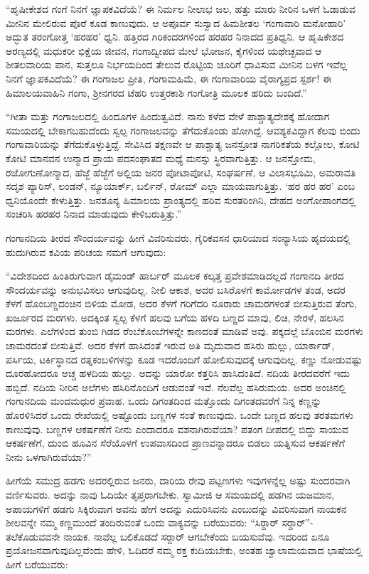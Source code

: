  “ಹೃಷೀಕೇಶದ ಗಂಗೆ ನಿನಗೆ ಜ್ಞಾಪಕವಿದೆಯೆ? ಈ ನಿರ್ಮಲ ನೀಲಾಭ ಜಲ, ಹತ್ತು ಮಾರು ನೀರಿನ ಒಳಗೆ ಓಡಾಡುವ ಮೀನಿನ ಮೇಲಿರುವ ಪೊರೆ ಕೂಡ ಕಾಣುವುದು. ಆ ಅಪೂರ್ವ ಸುಸ್ವಾದ ಹಿಮಶೀತಲ ‘ಗಂಗಾವಾರಿ ಮನೋಹಾರಿ’ ಅದ್ಭುತ ತರಂಗೋತ್ತ ‘ಹರಹರ’ ಧ್ವನಿ. ಹತ್ತಿರದ ಗಿರಿಕಂದರಗಳಿಂದ ಹರಹರ ನಿನಾದದ ಪ್ರತಿಧ್ವನಿ. ಆ ಹೃಷಿಕೇಶದ ಅರಣ್ಯದಲ್ಲಿ ಮಧುಕರೀ ಭಿಕ್ಷೆಯ ಜೀವನ, ಗಂಗಾದ್ವೀಪದ ಮೇಲೆ ಭೋಜನ, ಕೈಗಳಿಂದ ಯಥೇಚ್ಛವಾದ ಆ ಶೀತಲವಾರಿಯ ಪಾನ, ಸುತ್ತಲೂ ನಿರ್ಭಯದಿಂದ ತೇಲುವ ರೊಟ್ಟಿಯ ಚೂರಿಗೆ ಧಾವಿಸುವ ಮೀನಿನ ಬಳಗ ಇವೆಲ್ಲ ನಿನಗೆ ಜ್ಞಾಪಕವಿದೆಯೆ? ಈ ಗಂಗಾಜಲ ಪ್ರೀತಿ, ಗಂಗಾಮಹಿಮೆ, ಈ ಗಂಗಾವಾರಿಯ ವೈರಾಗ್ಯಪ್ರದ ಸ್ಪರ್ಶ! ಈ ಹಿಮಾಲಯವಾಹಿನಿ ಗಂಗಾ, ಶ‍್ರೀನಗರದ ಟೆಹರಿ ಉತ್ತರಕಾಶಿ ಗಂಗೋತ್ರಿ ಮೂಲಕ ಹರಿದು ಬಂದಿದೆ.” 

 “ಗೀತಾ ಮತ್ತು ಗಂಗಾಜಲದಲ್ಲಿ ಹಿಂದೂಗಳ ಹಿಂದುತ್ವವಿದೆ. ನಾನು ಕಳೆದ ವೇಳೆ ಪಾಶ್ಚಾತ್ಯದೇಶಕ್ಕೆ ಹೋದಾಗ ಸಮಯದಲ್ಲಿ ಬೇಕಾಗಬಹುದೆಂದು ಸ್ವಲ್ಪ ಗಂಗಾಜಲವನ್ನು ತೆಗೆದುಕೊಂಡು ಹೋಗಿದ್ದೆ. ಆವಶ್ಯಕವಿದ್ದಾಗ ಕೆಲವು ಬಿಂದು ಗಂಗಾವಾರಿಯನ್ನು ತೆಗೆದುಕೊಳ್ಳುತ್ತಿದ್ದೆ. ಸೇವಿಸಿದ ತಕ್ಷಣವೇ ಆ ಪಾಶ್ಚಾತ್ಯ ಜನಸ್ರೋತ ನಾಗರಿಕತೆಯ ಕಲ್ಲೋಲ, ಕೋಟಿ ಕೋಟಿ ಮಾನವನ ಉನ್ಮಾದ ಪ್ರಾಯ ಪದಸಂಘಾತದ ಮಧ್ಯೆ ಮನಸ್ಸು ಸ್ಥಿರವಾಗುತ್ತಿತ್ತು. ಆ ಜನಸ್ತೋಮ, ರಜೋಗುಣೋನ್ಮಾದ, ಹೆಜ್ಜೆ ಹೆಜ್ಜೆಗೆ ಅಲ್ಲಿಯ ಜನರ ಪೋಟಾಪೋಟಿ, ಸಂಘರ್ಷಣೆ, ಆ ವಿಲಾಸಭೂಮಿ, ಅಮರಾವತಿ ಸದೃಶ ಪ್ಯಾರಿಸ್, ಲಂಡನ್, ನ್ಯೂಯಾರ್ಕ್, ಬರ್ಲಿನ್, ರೋಮ್ ಎಲ್ಲಾ ಮಾಯವಾಗುತ್ತಿತ್ತು. ‘ಹರ ಹರ ಹರ’ ಎಂಬ ಧ್ವನಿಯೊಂದೇ ಕೇಳುತ್ತಿತ್ತು. ಜನಶೂನ್ಯ ಹಿಮಾಲಯ ಪ್ರಾಂತ್ಯದಲ್ಲಿ ಹರಿವ ಸುರತರಿಂಗಿನಿ, ದೇಹದ ಅಂಗೋಪಾಂಗದಲ್ಲಿ ಸಂಚರಿಸಿ ಹರಹರ ನಿನಾದ ಮಾಡುವುದು ಕೇಳಿಬರುತ್ತಿತ್ತು.” 

 ಗಂಗಾನದಿಯ ತೀರದ ಸೌಂದರ್ಯವನ್ನು ಹೀಗೆ ವಿವರಿಸುವರು, ಗೈರಿಕವಸನ ಧಾರಿಯಾದ ಸಂನ್ಯಾಸಿಯ ಹೃದಯದಲ್ಲಿ ಹುದುಗಿರುವ ಕವಿಯ ಪರಿಚಯ ನಮಗೆ ಆಗುವುದು: 

 “ವಿದೇಶದಿಂದ ಹಿಂತಿರುಗುವಾಗ ಡೈಮಂಡ್ ಹಾರ್ಬರ್ ಮೂಲಕ ಕಲ್ಕತ್ತ ಪ್ರವೇಶಮಾಡಿದಲ್ಲದೆ ಗಂಗಾನದಿ ತೀರದ ಸೌಂದರ್ಯವನ್ನು ಅನುಭವಿಸಲು ಆಗುವುದಿಲ್ಲ. ನೀಲಿ ಆಕಾಶ, ಅದರ ಬಸಿರೊಳಗೆ ಕಾರ್ಮೋಡಗಳ ತಂಡ, ಅದರ ಕೆಳಗೆ ಹೊಂಬಣ್ಣದಂಚಿನ ಬಿಳಿಯ ಮೋಡ, ಅದರ ಕೆಳಗೆ ಗರಿಗೆದರಿ ನೂರಾರು ಚಾಮರಗಳಂತೆ ಬೀಸುತ್ತಿರುವ ತೆಂಗು, ಖರ್ಜೂರದ ಮರಗಳು. ಅದಕ್ಕಿಂತ ಸ್ವಲ್ಪ ಕೆಳಗೆ ಹಲವು ಬಗೆಯ ಹಳದಿ ಬಣ್ಣದ ಮಾವು, ಲಿಚಿ, ನೇರಳೆ, ಹಲಸಿನ ಮರಗಳು. ಎಲೆಗಳಿಂದ ತುಂಬಿ ಗಿಡದ ರೆಂಬೆಕೊಂಬೆಗಳನ್ನೇ ಕಾಣದಂತೆ ಮಾಡಿವೆ ಅವು. ಪಕ್ಕದಲ್ಲೆ ಬೊಂಬಿನ ಮರಗಳು ಚಾಮರದಂತೆ ಬೀಸುತ್ತಿವೆ. ಅದರ ಕೆಳಗೆ ಹಾಸಿದಂತೆ ಇರುವ ಅತಿ ಮೃದುವಾದ ಹಸಿರು ಹುಲ್ಲು, ಯಾರ್ಕಾಡ್, ಪರ್ಸಿಯ, ಟರ್ಕಿಸ್ಥಾನದ ರತ್ನಕಂಬಳಿಗಳನ್ನು ಕೂಡ ಇದರೊಂದಿಗೆ ಹೋಲಿಸುವುದಕ್ಕೆ ಆಗುವುದಿಲ್ಲ. ಕಣ್ಣು ನೋಡುವಷ್ಟು ದೂರಹೋದರೂ ಅಚ್ಚ ಹಳದಿಯ ಹುಲ್ಲು. ಅದನ್ನು ಯಾರೋ ಕತ್ತರಿಸಿ ಹಾಸಿದಂತಿದೆ. ನದಿಯ ತೀರದವರೆಗೆ ಇದು ಹಬ್ಬಿದೆ. ನದಿಯ ನೀರಿನ ಅಲೆಗಳು ಹಸಿರಿನೊಂದಿಗೆ ಆಡುವಂತೆ ಇವೆ. ನೆಲವೆಲ್ಲ ಹಸಿರುಮಯ. ಅದರ ಅಂಚಿನಲ್ಲಿ ಗಂಗಾನದಿಯ ಮಂದಮಧುರ ಪ್ರವಾಹ. ಒಂದು ದಿಗಂತದಿಂದ ಮತ್ತೊಂದು ದಿಗಂತದವರೆಗೆ ನಿನ್ನ ಕಣ್ಣನ್ನು ಹೊರಳಿಸಿದರೆ ಒಂದು ರೇಖೆಯಲ್ಲಿ ಅಷ್ಟೊಂದು ಬಣ್ಣಗಳ ಸಂತೆ ಕಾಣುವುದು. ಒಂದೇ ಬಣ್ಣದ ಹಲವು ತರತಮಗಳು ಕಾಣುವುವು. ಬಣ್ಣಗಳ ಆಕರ್ಷಣೆಗೆ ನೀನು ಎಂದಾದರೂ ವಶನಾಗಿರುವೆಯಾ? ಪತಂಗ ದೀಪದಲ್ಲಿ ಬಿದ್ದು ಸಾಯುವ ಆಕರ್ಷಣೆಗೆ, ದುಂಬಿ ಹೂವಿನ ಸೆರೆಯೊಳಗೆ ಉಪವಾಸದಿಂದ ಪ್ರಾಣವನ್ನಾದರೂ ಬಿಡಲು ಯತ್ನಿಸುವ ಆಕರ್ಷಣೆಗೆ ನೀನು ಒಳಗಾಗಿರುವೆಯಾ?” 

 ಹೀಗೆಯೆ ಸಮುದ್ರ ಹಡಗು ಅದರಲ್ಲಿರುವ ಜನರು, ದಾರಿಯ ರೇವು ಪಟ್ಟಣಗಳು ಇವುಗಳನ್ನೆಲ್ಲ ಅಷ್ಟು ಸುಂದರವಾಗಿ ವರ್ಣಿಸುವರು. ಅದನ್ನು ನಾವು ಓದಿಯೇ ತೃಪ್ತರಾಗಬೇಕು. ಸ್ವಾಮೀಜಿ ಆ ಸಮಯದಲ್ಲಿ ಹಡಗಿನ ಯಜಮಾನ, ಅಪಾಯಗಳಿಗೆ ಹಡಗು ಸಿಕ್ಕಿರುವಾಗ ಅವನು ಹೇಗೆ ಅದನ್ನು ಎದುರಿಸಿವನು ಎಂಬುದನ್ನು ವಿವರಿಸುವಾಗ ನಾಯಕನ ಶೀಲವನ್ನೇ ನಮ್ಮ ಕಣ್ಣಮುಂದೆ ತಂದಿರುವಂತೆ ಒಂದು ವಾಕ್ಯವನ್ನು ಬರೆಯುವರು: “ಸಿರ್‍ದಾರ್ ಸರ್‍ದಾರ್”- ತಲೆಕೊಡುವವನೇ ನಾಯಕ. ನಾವೆಲ್ಲ ಬಲಿಕೊಡದೆ ಸರ್‍ದಾರ್ ಆಗಬೇಕೆಂದು ಬಯಸುವೆವು. ಇದರಿಂದ ಏನೂ ಪ್ರಯೋಜನವಾಗುವುದಿಲ್ಲವೆಂದು ಹೇಳಿ, ಓದಿದರೆ ನಮ್ಮ ರಕ್ತ ಕುದಿಯಬೇಕು, ಅಂತಹ ಜ್ವಾಲಾಮಯವಾದ ಭಾಷೆಯಲ್ಲಿ ಹೀಗೆ ಬರೆಯುವರು: 

